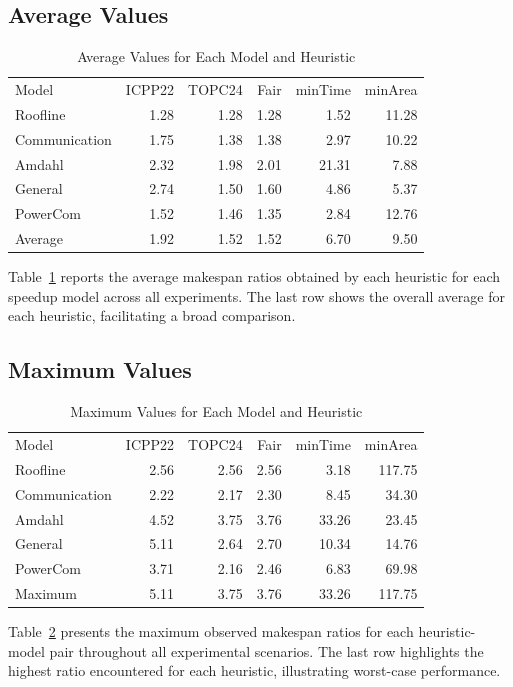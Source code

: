 \documentclass{article}
\begin{document}
\subsection{Average Values}
\begin{table}[htbp]
\centering
\caption{Average Values for Each Model and Heuristic}
\label{tab:average_valuesap}
\begin{tabular}{lrrrrr}
\toprule
Model & ICPP22 & TOPC24 & Fair & minTime & minArea \\
Roofline & 1.28 & 1.28 & 1.28 & 1.52 & 11.28 \\
Communication & 1.75 & 1.38 & 1.38 & 2.97 & 10.22 \\
Amdahl & 2.32 & 1.98 & 2.01 & 21.31 & 7.88 \\
General & 2.74 & 1.50 & 1.60 & 4.86 & 5.37 \\
PowerCom & 1.52 & 1.46 & 1.35 & 2.84 & 12.76 \\
\midrule
Average & 1.92 & 1.52 & 1.52 & 6.70 & 9.50 \\
\bottomrule
\end{tabular}
\end{table}


Table~\ref{tab:average_valuesap} reports the average makespan ratios obtained by each heuristic for each speedup model across all experiments. The last row shows the overall average for each heuristic, facilitating a broad comparison.

\subsection{Maximum Values}
\begin{table}[htbp]
\centering
\caption{Maximum Values for Each Model and Heuristic}
\label{tab:maximum_values}
\begin{tabular}{lrrrrr}
\toprule
Model & ICPP22 & TOPC24 & Fair & minTime & minArea \\
Roofline & 2.56 & 2.56 & 2.56 & 3.18 & 117.75 \\
Communication & 2.22 & 2.17 & 2.30 & 8.45 & 34.30 \\
Amdahl & 4.52 & 3.75 & 3.76 & 33.26 & 23.45 \\
General & 5.11 & 2.64 & 2.70 & 10.34 & 14.76 \\
PowerCom & 3.71 & 2.16 & 2.46 & 6.83 & 69.98 \\
\midrule
Maximum & 5.11 & 3.75 & 3.76 & 33.26 & 117.75 \\
\bottomrule
\end{tabular}
\end{table}

Table~\ref{tab:maximum_values} presents the maximum observed makespan ratios for each heuristic-model pair throughout all experimental scenarios. The last row highlights the highest ratio encountered for each heuristic, illustrating worst-case performance.

\FloatBarrier 
\end{document}
